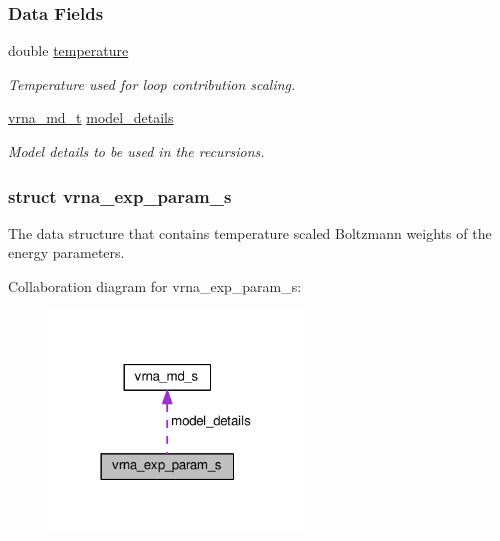 \subsubsection*{Data Fields}
\begin{DoxyCompactItemize}
\item 
double \hyperlink{group__energy__parameters_aeed2cd83713012bcb52e431041e037c8}{temperature}\hypertarget{group__energy__parameters_aeed2cd83713012bcb52e431041e037c8}{}\label{group__energy__parameters_aeed2cd83713012bcb52e431041e037c8}

\begin{DoxyCompactList}\small\item\em Temperature used for loop contribution scaling. \end{DoxyCompactList}\item 
\hyperlink{group__model__details_ga1f8a10e12a0a1915f2a4eff0b28ea17c}{vrna\+\_\+md\+\_\+t} \hyperlink{group__energy__parameters_a7b84353eb9075c595bad4ceb871bcae7}{model\+\_\+details}\hypertarget{group__energy__parameters_a7b84353eb9075c595bad4ceb871bcae7}{}\label{group__energy__parameters_a7b84353eb9075c595bad4ceb871bcae7}

\begin{DoxyCompactList}\small\item\em Model details to be used in the recursions. \end{DoxyCompactList}\end{DoxyCompactItemize}
\label{structvrna__exp__param__s}
\hypertarget{group__energy__parameters_structvrna__exp__param__s}{}
\subsubsection{struct vrna\+\_\+exp\+\_\+param\+\_\+s}
The data structure that contains temperature scaled Boltzmann weights of the energy parameters. 

Collaboration diagram for vrna\+\_\+exp\+\_\+param\+\_\+s\+:
\nopagebreak
\begin{figure}[H]
\begin{center}
\leavevmode
\includegraphics[width=194pt]{structvrna__exp__param__s__coll__graph}
\end{center}
\end{figure}
